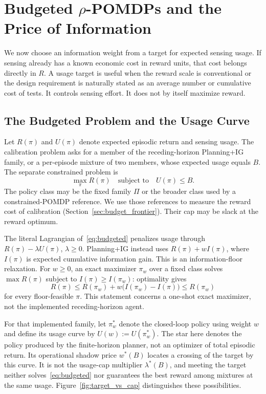 \documentclass[manuscript, screen, review]{jair}
\begin{document}
\section{Budgeted $\rho$-POMDPs and the Price of Information}
\label{sec:budget}

We now choose an information weight from a target for expected sensing usage. If sensing already has a known economic cost in reward units, that cost belongs directly in $R$. A usage target is useful when the reward scale is conventional or the design requirement is naturally stated as an average number or cumulative cost of tests. It controls sensing effort. It does not by itself maximize reward.

\subsection{The Budgeted Problem and the Usage Curve}
\label{sec:budget_theory}

Let $R(\pi)$ and $U(\pi)$ denote expected episodic return and sensing usage. The calibration problem asks for a member of the receding-horizon Planning+IG family, or a per-episode mixture of two members, whose expected usage equals $B$. The separate constrained problem is
\begin{equation}
\label{eq:budgeted}
\max_\pi R(\pi)\quad\text{subject to}\quad U(\pi)\le B.
\end{equation}
The policy class may be the fixed family $\Pi$ or the broader class used by a constrained-POMDP reference. We use those references to measure the reward cost of calibration (Section~\ref{sec:budget_frontier}). Their cap may be slack at the reward optimum.

The literal Lagrangian of~\eqref{eq:budgeted} penalizes usage through $R(\pi)-\lambda U(\pi)$, $\lambda\ge0$. Planning+IG instead uses $R(\pi)+wI(\pi)$, where $I(\pi)$ is expected cumulative information gain. This is an information-floor relaxation. For $w\ge0$, an exact maximizer $\pi_w$ over a fixed class solves $\max R(\pi)$ subject to $I(\pi)\ge I(\pi_w)$: optimality gives
\[
R(\pi)\le R(\pi_w)+w\big(I(\pi_w)-I(\pi)\big)\le R(\pi_w)
\]
for every floor-feasible $\pi$. This statement concerns a one-shot exact maximizer, not the implemented receding-horizon agent.

For that implemented family, let $\pi^*_w$ denote the closed-loop policy using weight $w$ and define its usage curve by $U(w):=U(\pi^*_w)$. The star here denotes the policy produced by the finite-horizon planner, not an optimizer of total episodic return. Its operational shadow price $w^*(B)$ locates a crossing of the target by this curve. It is not the usage-cap multiplier $\lambda^*(B)$, and meeting the target neither solves~\eqref{eq:budgeted} nor guarantees the best reward among mixtures at the same usage. Figure~\ref{fig:target_vs_cap} distinguishes these possibilities.
\end{document}
